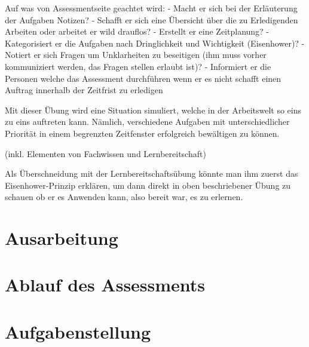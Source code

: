 Auf was von Assessmentseite geachtet wird:
- Macht er sich bei der Erläuterung der Aufgaben Notizen?
- Schafft er sich eine Übersicht über die zu Erledigenden Arbeiten oder arbeitet er wild drauflos?
- Erstellt er eine Zeitplanung?
- Kategorisiert er die Aufgaben nach Dringlichkeit und Wichtigkeit (Eisenhower)?
- Notiert er sich Fragen um Unklarheiten zu beseitigen (ihm muss vorher kommuniziert werden, das Fragen stellen erlaubt ist)?
- Informiert er die Personen welche das Assessment durchführen wenn er es nicht schafft einen Auftrag innerhalb der Zeitfrist zu erledigen

Mit dieser Übung wird eine Situation simuliert, welche in der Arbeitswelt so eins zu eins auftreten kann. Nämlich, verschiedene Aufgaben mit unterschiedlicher Priorität in einem begrenzten Zeitfenster erfolgreich bewältigen zu können.


(inkl. Elementen von Fachwissen und Lernbereitschaft)

Als Überschneidung mit der Lernbereitschaftsübung könnte man ihm zuerst das Eisenhower-Prinzip erklären, um dann direkt in oben beschriebener Übung zu schauen ob er es Anwenden kann, also bereit war, es zu erlernen. 

\section{Ausarbeitung}

\section{Ablauf des Assessments}

\section{Aufgabenstellung}